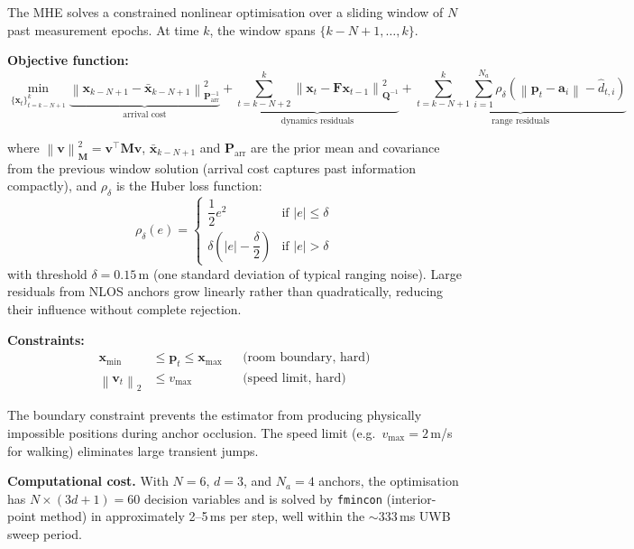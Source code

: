 \documentclass[11pt,a4paper]{article}
\newcommand{\vect}[1]{\bm{#1}}
\newcommand{\mat}[1]{\mathbf{#1}}
\newcommand{\norm}[1]{\left\|#1\right\|}
\newcommand{\abs}[1]{\left|#1\right|}
\newcommand{\Trans}{^{\top}}
\begin{document}
The MHE solves a constrained nonlinear optimisation over a sliding window of $N$ past measurement epochs. At time $k$, the window spans $\{k-N+1, \ldots, k\}$.

\textbf{Objective function:}
\begin{equation}
\min_{\{\vect{x}_t\}_{t=k-N+1}^{k}} \underbrace{\norm{\vect{x}_{k-N+1} - \bar{\vect{x}}_{k-N+1}}_{\mat{P}_\text{arr}^{-1}}^2}_{\text{arrival cost}} + \underbrace{\sum_{t=k-N+2}^{k} \norm{\vect{x}_t - \mat{F}\vect{x}_{t-1}}_{\mat{Q}^{-1}}^2}_{\text{dynamics residuals}} + \underbrace{\sum_{t=k-N+1}^{k} \sum_{i=1}^{N_a} \rho_\delta\!\left(\norm{\vect{p}_t - \vect{a}_i} - \hat{d}_{t,i}\right)}_{\text{range residuals}}
\label{eq:mhe}
\end{equation}

where $\norm{\vect{v}}_{\mat{M}}^2 = \vect{v}\Trans \mat{M} \vect{v}$, $\bar{\vect{x}}_{k-N+1}$ and $\mat{P}_\text{arr}$ are the prior mean and covariance from the previous window solution (arrival cost captures past information compactly), and $\rho_\delta$ is the Huber loss function:
\begin{equation}
\rho_\delta(e) = \begin{cases}
\dfrac{1}{2}e^2 & \text{if } \abs{e} \leq \delta \\[6pt]
\delta\!\left(\abs{e} - \dfrac{\delta}{2}\right) & \text{if } \abs{e} > \delta
\end{cases}
\label{eq:huber}
\end{equation}
with threshold $\delta = 0.15$\,m (one standard deviation of typical ranging noise). Large residuals from NLOS anchors grow linearly rather than quadratically, reducing their influence without complete rejection.

\textbf{Constraints:}
\begin{align}
\vect{x}_\text{min} &\leq \vect{p}_t \leq \vect{x}_\text{max} & &\text{(room boundary, hard)} \label{eq:bound}\\
\norm{\vect{v}_t}_2 &\leq v_\text{max} & &\text{(speed limit, hard)} \label{eq:speed}
\end{align}

The boundary constraint prevents the estimator from producing physically impossible positions during anchor occlusion. The speed limit (e.g.\ $v_\text{max} = 2$\,m/s for walking) eliminates large transient jumps.

\textbf{Computational cost.} With $N = 6$, $d = 3$, and $N_a = 4$ anchors, the optimisation has $N \times (3d+1) = 60$ decision variables and is solved by \texttt{fmincon} (interior-point method) in approximately 2--5\,ms per step, well within the $\sim$333\,ms UWB sweep period.
\end{document}
